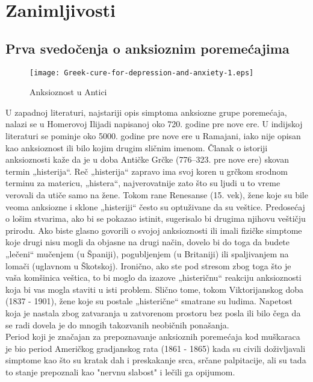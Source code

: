 \documentclass[a4paper]{article}
\begin{document}
            \section{Zanimljivosti}
		\label{sec:podnaslov4}
		
		
		\subsection{Prva svedočenja o anksioznim poremećajima}
		\label{subsec:}
  			
            \begin{figure}[h]
            \caption{ Anksioznost u Antici }
            \centering
            \texttt{[image: Greek-cure-for-depression-and-anxiety-1.eps]}
            \end{figure}
              U zapadnoj literaturi, najstariji opis simptoma anksiozne grupe poremećaja, nalazi se u Homerovoj Ilijadi napisanoj oko 720. godine pre nove ere. U indijskoj literaturi se pominje oko 5000. godine pre nove ere u Ramajani, iako nije opisan kao anksioznost ili bilo kojim drugim sličnim imenom. \cite{sesta}
            Članak \cite{sedma}  o istoriji anksioznosti kaže da je u doba Antičke Grčke (776–323. pre nove ere) skovan termin „histerija“. Reč „histerija“ zapravo ima svoj koren u grčkom srodnom terminu za matericu, „histera“, najverovatnije zato što su ljudi u to vreme verovali da utiče samo na žene. Tokom rane Renesanse (15. vek), žene koje su bile veoma anksiozne i sklone „histeriji“ često su optuživane da su veštice. Predosećaj o lošim stvarima, ako bi se pokazao istinit, sugerisalo bi drugima njihovu veštičju prirodu. Ako biste glasno govorili o svojoj anksioznosti ili imali fizičke simptome koje drugi nisu mogli da objasne na drugi način, dovelo bi do toga da budete „lečeni“ mučenjem (u Španiji), pogubljenjem (u Britaniji) ili spaljivanjem na lomači (uglavnom u Škotskoj). Ironično, ako ste pod stresom zbog toga što je vaša komšinica veštica, to bi moglo da izazove „histeričnu“ reakciju anksioznosti koja bi vas mogla staviti u isti problem. Slično tome, tokom Viktorijanskog doba (1837 - 1901), žene koje su postale „histerične“ smatrane su ludima. Napetost koja je nastala zbog zatvaranja u zatvorenom prostoru bez posla ili bilo čega da se radi dovela je do mnogih takozvanih neobičnih ponašanja. \\
      
             Period koji je značajan za prepoznavanje anksioznih poremećaja kod muškaraca je bio period Američkog gradjanskog rata (1861 - 1865) kada su civili doživljavali simptome kao što su kratak dah i preskakanje srca, srčane palpitacije, ali su tada to stanje prepoznali kao "nervnu slabost" i lečili ga opijumom.  \\
             
\end{document}
